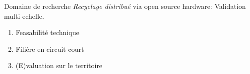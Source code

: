 \documentclass[
  11pt,
  ignorenonframetext,
  aspectratio=169,
  c]{beamer}
\providecommand{\tightlist}{%
  \setlength{\itemsep}{0pt}\setlength{\parskip}{0pt}}\usepackage{longtable,booktabs,array}
\begin{document}
\begin{frame}[t]{Domaine de recherche}
\protect\hypertarget{domaine-de-recherche-1}{}
\emph{Recyclage distribué} via open source hardware: Validation
multi-echelle.

\begin{enumerate}
\tightlist
\item
  Feasabilité technique
\item
  Filière en circuit court
\item
  (E)valuation sur le territoire
\end{enumerate}


\note{}
\end{frame}
\end{document}
